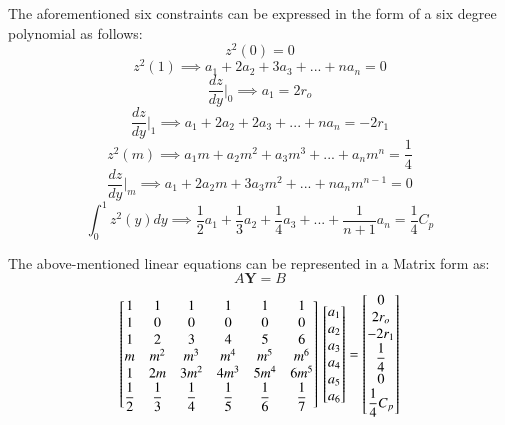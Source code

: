 The aforementioned six constraints can be expressed in the form of a six degree polynomial as follows:
\begin{equation}
z^2(0) = 0
\end{equation}
\begin{equation}
z^2(1) \implies a_1 + 2a_2 + 3a_3 +...+na_n = 0
\end{equation}
\begin{equation}
\dfrac{dz}{dy}\Big|_0 \implies a_1= 2r_o
\end{equation}
\begin{equation}
\dfrac{dz}{dy}\Big|_1 \implies a_1 + 2a_2 + 2a_3 +...+na_n = -2r_1
\end{equation}
\begin{equation}
z^2(m)\implies a_1m + a_2m^2 + a_3m^3 + ... + a_nm^n = \frac{1}{4}	
\end{equation}
\begin{equation}
\dfrac{dz}{dy}\Big|_m \implies a_1 + 2a_2m + 3a_3m^2 + ... + na_nm^{n-1} =0	
\end{equation}
\begin{equation}
\int_{0}^{1} z^2(y)dy \implies \dfrac{1}{2}a_1	+ \dfrac{1}{3}a_2 + \dfrac{1}{4}a_3+ ... + \dfrac{1}{n+1}a_n = \dfrac{1}{4}C_p
\end{equation}

The above-mentioned linear equations can be represented in a Matrix form as:
\begin{equation}
A\bm{Y} = B
\end{equation}
\[
\begin{bmatrix}
1 & 1 & 1 & 1 & 1 & 1 \\
1 & 0 & 0 & 0 & 0 & 0 \\
1 & 2 & 3 & 4 & 5 & 6 \\
m & m^2 & m^3 & m^4 & m^5 & m^6 \\
1 & 2m & 3m^2 & 4m^3 & 5m^4 & 6m^5 \\
\dfrac{1}{2} & \dfrac{1}{3} & \dfrac{1}{4} & \dfrac{1}{5} & \dfrac{1}{6} & \dfrac{1}{7} \\
\end{bmatrix}
\\
\begin{bmatrix}
a_1\\
a_2\\
a_3\\
a_4\\
a_5\\
a_6\\
\end{bmatrix}
=
\begin{bmatrix}
0\\
2r_o\\
-2r_1\\
\dfrac{1}{4}\\
0\\
\dfrac{1}{4}C_p\\
\end{bmatrix}
\]


